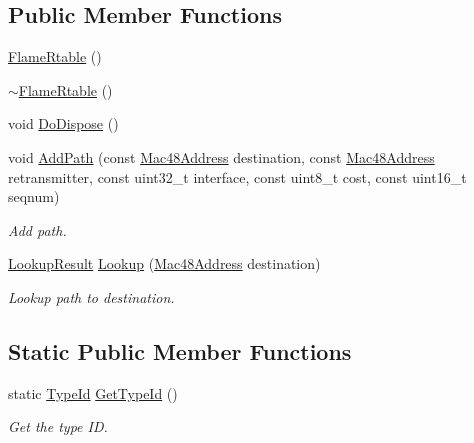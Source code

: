 \subsection*{Public Member Functions}
\begin{DoxyCompactItemize}
\item 
\hyperlink{classns3_1_1flame_1_1FlameRtable_a12c3176df010f2b2978304c1746afbf7}{Flame\+Rtable} ()
\item 
\hyperlink{classns3_1_1flame_1_1FlameRtable_a4973a783edcdb58388529e187e98ddfa}{$\sim$\+Flame\+Rtable} ()
\item 
void \hyperlink{classns3_1_1flame_1_1FlameRtable_a3587c071a9237768f4129a2e59bdbade}{Do\+Dispose} ()
\item 
void \hyperlink{classns3_1_1flame_1_1FlameRtable_a36691736ca6d88ddd0f38484553688cf}{Add\+Path} (const \hyperlink{classns3_1_1Mac48Address}{Mac48\+Address} destination, const \hyperlink{classns3_1_1Mac48Address}{Mac48\+Address} retransmitter, const uint32\+\_\+t interface, const uint8\+\_\+t cost, const uint16\+\_\+t seqnum)
\begin{DoxyCompactList}\small\item\em Add path. \end{DoxyCompactList}\item 
\hyperlink{structns3_1_1flame_1_1FlameRtable_1_1LookupResult}{Lookup\+Result} \hyperlink{classns3_1_1flame_1_1FlameRtable_a0325101feac0af5e36ed5e29d2e7e74a}{Lookup} (\hyperlink{classns3_1_1Mac48Address}{Mac48\+Address} destination)
\begin{DoxyCompactList}\small\item\em Lookup path to destination. \end{DoxyCompactList}\end{DoxyCompactItemize}
\subsection*{Static Public Member Functions}
\begin{DoxyCompactItemize}
\item 
static \hyperlink{classns3_1_1TypeId}{Type\+Id} \hyperlink{classns3_1_1flame_1_1FlameRtable_a69e3f61f14c8493d4b73d9f5f43cd536}{Get\+Type\+Id} ()
\begin{DoxyCompactList}\small\item\em Get the type ID. \end{DoxyCompactList}\end{DoxyCompactItemize}
